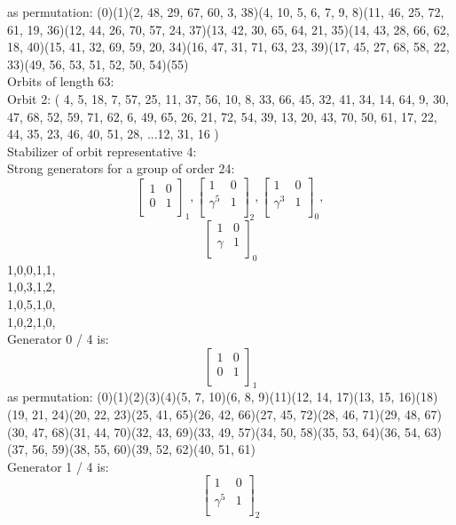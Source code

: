 as permutation:
(0)(1)(2, 48, 29, 67, 60, 3, 38)(4, 10, 5, 6, 7, 9, 8)(11, 46, 25, 72, 61, 19, 36)(12, 44, 26, 70, 57, 24, 37)(13, 42, 30, 65, 64, 21, 35)(14, 43, 28, 66, 62, 18, 40)(15, 41, 32, 69, 59, 20, 34)(16, 47, 31, 71, 63, 23, 39)(17, 45, 27, 68, 58, 22, 33)(49, 56, 53, 51, 52, 50, 54)(55)\\
Orbits of length 63:\\
Orbit 2:
( 4, 5, 18, 7, 57, 25, 11, 37, 56, 10, 8, 33, 66, 45, 32, 41, 34, 14, 64, 9, 30, 47, 68, 52, 59, 71, 62, 6, 49, 65, 26, 21, 72, 54, 39, 13, 20, 43, 70, 50, 61, 17, 22, 44, 35, 23, 46, 40, 51, 28, ...12, 31, 16 )\\
Stabilizer of orbit representative 4:\\
Strong generators for a group of order 24:
$$
\left[
\begin{array}{*{2}{r}}
1 & 0\\
0 & 1\\
\end{array}
\right]
_{1}
, 
\left[
\begin{array}{*{2}{r}}
1 & 0\\
\gamma^{5} & 1\\
\end{array}
\right]
_{2}
, 
\left[
\begin{array}{*{2}{r}}
1 & 0\\
\gamma^{3} & 1\\
\end{array}
\right]
_{0}
, 
$$
$$
\left[
\begin{array}{*{2}{r}}
1 & 0\\
\gamma  & 1\\
\end{array}
\right]
_{0}
$$
1,0,0,1,1,\\
1,0,3,1,2,\\
1,0,5,1,0,\\
1,0,2,1,0,\\
Generator 0 / 4 is:
$$
\left[
\begin{array}{*{2}{r}}
1 & 0\\
0 & 1\\
\end{array}
\right]
_{1}
$$
as permutation:
(0)(1)(2)(3)(4)(5, 7, 10)(6, 8, 9)(11)(12, 14, 17)(13, 15, 16)(18)(19, 21, 24)(20, 22, 23)(25, 41, 65)(26, 42, 66)(27, 45, 72)(28, 46, 71)(29, 48, 67)(30, 47, 68)(31, 44, 70)(32, 43, 69)(33, 49, 57)(34, 50, 58)(35, 53, 64)(36, 54, 63)(37, 56, 59)(38, 55, 60)(39, 52, 62)(40, 51, 61)\\
Generator 1 / 4 is:
$$
\left[
\begin{array}{*{2}{r}}
1 & 0\\
\gamma^{5} & 1\\
\end{array}
\right]
_{2}
$$
